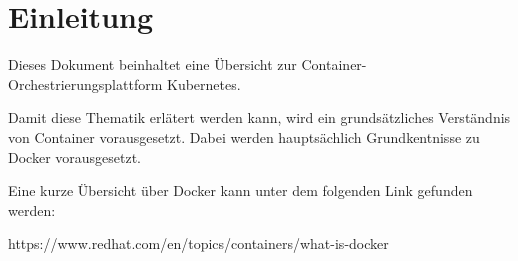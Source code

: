 \section{Einleitung}
Dieses Dokument beinhaltet eine Übersicht zur Container-Orchestrierungsplattform Kubernetes.

Damit diese Thematik erlätert werden kann, wird ein grundsätzliches Verständnis von Container vorausgesetzt. 
Dabei werden hauptsächlich Grundkentnisse zu Docker vorausgesetzt.

Eine kurze Übersicht über Docker kann unter dem folgenden Link gefunden werden:  
 
https://www.redhat.com/en/topics/containers/what-is-docker
\clearpage